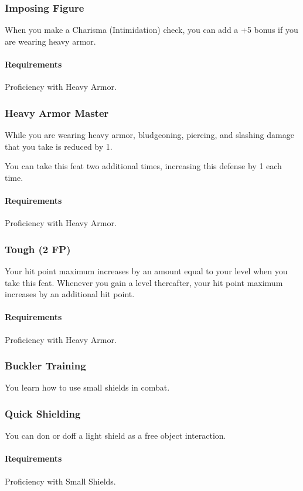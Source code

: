 \subsubsection{Imposing Figure} \label{feat::imposingfigure}
    When you make a Charisma (Intimidation) check, you can add a +5 bonus if you are wearing heavy armor.
    \paragraph{Requirements} Proficiency with Heavy Armor.
\subsubsection{Heavy Armor Master} \label{feat::heavyarmormaster}
    While you are wearing heavy armor, bludgeoning, piercing, and slashing damage that you take is reduced by 1.

    You can take this feat two additional times, increasing this defense by 1 each time.
    \paragraph{Requirements} Proficiency with Heavy Armor.
\subsubsection{Tough (2 FP)} \label{feat::tough}
    Your hit point maximum increases by an amount equal to your level when you take this feat.
    Whenever you gain a level thereafter, your hit point maximum increases by an additional hit point.
    \paragraph{Requirements} Proficiency with Heavy Armor.

\subsubsection{Buckler Training} \label{feat::bucklertraining}
    You learn how to use small shields in combat.
\subsubsection{Quick Shielding} \label{feat::quickshielding}
    You can don or doff a light shield as a free object interaction.
    \paragraph{Requirements} Proficiency with Small Shields.
